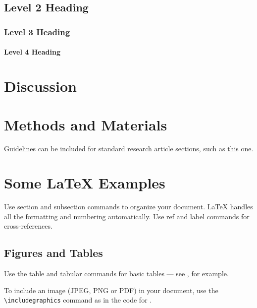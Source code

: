 \documentclass[9pt,bestpractices]{livecoms}
\begin{document}
\subsection{Level 2 Heading}

\lipsum[3]

\subsubsection{Level 3 Heading}

\lipsum[5]

\paragraph{Level 4 Heading}
\lipsum[7]

\section{Discussion}

\lipsum[9]

\section{Methods and Materials}

Guidelines can be included for standard research article sections, such as this one.

\lipsum[3]

\section{Some \LaTeX{} Examples}
\label{sec:examples}

Use section and subsection commands to organize your document. \LaTeX{} handles all the formatting and numbering automatically. Use ref and label commands for cross-references.

\subsection{Figures and Tables}

Use the table and tabular commands for basic tables --- see , for example.

To include an image (JPEG, PNG or PDF) in your document, use the \verb|\includegraphics| command as in the code for .
\end{document}
